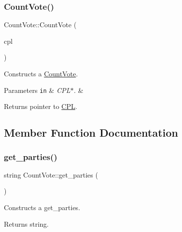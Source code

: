 \subsubsection{\texorpdfstring{Count\+Vote()}{CountVote()}}
{\footnotesize\ttfamily Count\+Vote\+::\+Count\+Vote (\begin{DoxyParamCaption}\item[{\hyperlink{classCPL}{C\+PL} $\ast$}]{cpl }\end{DoxyParamCaption})}



Constructs a \hyperlink{classCountVote}{Count\+Vote}. 


\begin{DoxyParams}[1]{Parameters}
\mbox{\tt in}  & {\em C\+P\+L$\ast$.} & \\
\hline
\end{DoxyParams}
\begin{DoxyReturn}{Returns}
pointer to \hyperlink{classCPL}{C\+PL}. 
\end{DoxyReturn}


\subsection{Member Function Documentation}
\mbox{\label{classCountVote_a67aee22b5f3dee3c24a0cd49105a9a4c}} 
\subsubsection{\texorpdfstring{get\+\_\+parties()}{get\_parties()}}
{\footnotesize\ttfamily string Count\+Vote\+::get\+\_\+parties (\begin{DoxyParamCaption}{ }\end{DoxyParamCaption})}



Constructs a get\+\_\+parties. 

\begin{DoxyReturn}{Returns}
string. 
\end{DoxyReturn}
\mbox{\label{classCountVote_a6bdd57641102485e77145dd078b38b93}} 
